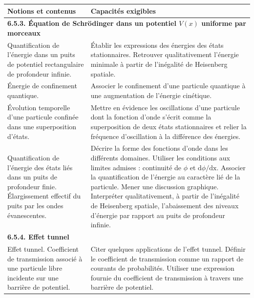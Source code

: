 {\scriptsize
        \begin{tabularx}{\textwidth}{|p{}|X|}
            \hline 
            \textbf{Notions et contenus} & \textbf{Capacités exigibles} \\
            \hline 
            \multicolumn{2}{|l|}{\textbf{6.5.3. Équation de Schrödinger dans un potentiel $V(x)$ uniforme par morceaux }} \\
            \hline
            Quantification de l'énergie dans un puits de potentiel rectangulaire de profondeur infinie.  & 
            Établir les expressions des énergies des états stationnaires.
Retrouver qualitativement l'énergie minimale à partir de l'inégalité de Heisenberg spatiale. \\
            \hline 
            Énergie de confinement quantique.   & 
            Associer le confinement d'une particule quantique à une augmentation de l'énergie cinétique. \\
        \hline    
        Évolution temporelle d'une particule confinée dans une superposition d'états. & 
        Mettre en évidence les oscillations d'une particule dont la fonction d'onde s'écrit comme la superposition de deux états stationnaires et relier la fréquence d'oscillation à la différence des énergies. \\
        \hline
        Quantification de l'énergie des états liés dans un puits de profondeur finie. Élargissement effectif du puits par les ondes évanescentes. &
        Décrire la forme des fonctions d'onde dans les différents domaines. Utiliser les conditions aux limites admises : continuité de $\phi$ et $\mathrm{d} \phi / \mathrm{dx}$. Associer la quantification de l'énergie au caractère lié de la particule.
Mener une discussion graphique. Interpréter qualitativement, à partir de l'inégalité de Heisenberg spatiale, l'abaissement des niveaux d'énergie par rapport au puits de profondeur infinie. \\
\hline
\multicolumn{2}{|l|}{\textbf{ 6.5.4. Effet tunnel }} \\
        \hline
        Effet tunnel.
Coefficient de transmission associé à une particule libre incidente sur une barrière de potentiel. & Citer quelques applications de l'effet tunnel. Définir le coefficient de transmission comme un rapport de courants de probabilités. Utiliser une expression fournie du coefficient de transmission à travers une barrière de potentiel. \\
        \hline
        \end{tabularx}
}
